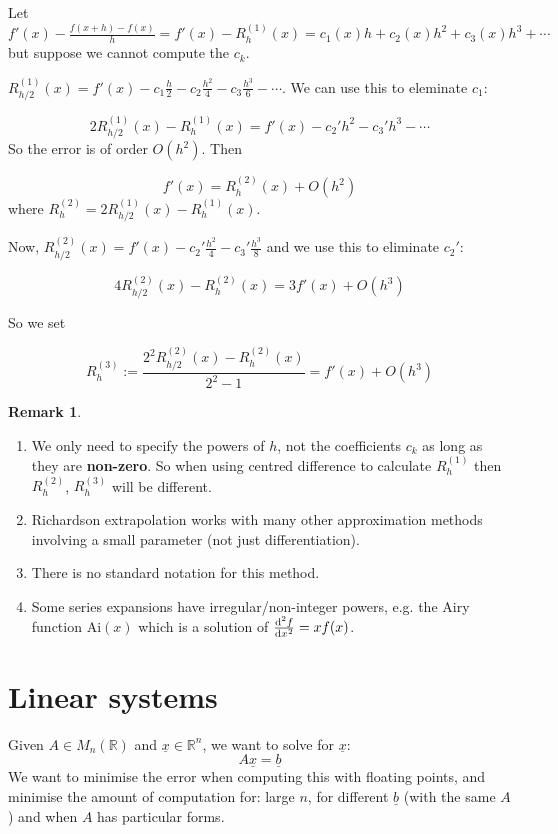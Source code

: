 \documentclass[12pt,a4paper]{article}
\theoremstyle{definition}
\newtheorem*{remark}{Remark}
\begin{document}
Let $f'(x) - \frac{f(x + h) - f(x)}{h} = f'(x) - R_h^{(1)} (x) = c_1(x) h + c_2(x) h^2 + c_3(x) h^3 + \cdots$ but suppose we cannot compute the $c_k$.

$R_{h / 2}^{(1)} (x) = f'(x) - c_1 \frac{h}{2} - c_2 \frac{h^2}{4} - c_3 \frac{h^3}{6} - \cdots$. We can use this to eleminate $c_1$:

\[ 2 R_{h / 2}^{(1)} (x) - R_h^{(1)} (x) = f'(x) - c_2' h^2 - c_3' h^3 - \cdots \]
So the error is of order $O(h^2)$. Then

\[ f'(x) = R_h^{(2)} (x) + O(h^2) \]
where $R_h^{(2)} = 2 R_{h / 2}^{(1)} (x) - R_h^{(1)} (x)$.

Now, $R_{h / 2}^{(2)} (x) = f'(x) - c_2' \frac{h^2}{4} - c_3' \frac{h^3}{8}$ and we use this to eliminate $c_2'$:

\[ 4 R_{h / 2}^{(2)} (x) - R_h^{(2)} (x) = 3 f'(x) + O(h^3) \]

So we set

\[ R_h^{(3)} := \frac{2^2 R_{h / 2}^{(2)} (x) - R_h^{(2)}(x)}{2^2 - 1} = f'(x) + O(h^3) \]

\begin{remark}
	\hfill
	\begin{enumerate}
		\item We only need to specify the powers of $h$, not the coefficients $c_k$ as long as they are \textbf{non-zero}. So when using centred difference to calculate $R_h^{(1)}$ then $R_h^{(2)}$, $R_h^{(3)}$ will be different.
		\item Richardson extrapolation works with many other approximation methods involving a small parameter (not just differentiation).
		\item There is no standard notation for this method.
		\item Some series expansions have irregular/non-integer powers, e.g. the Airy function $\text{Ai}(x)$ which is a solution of $\diff[2]{f}{x} = x f(x)$.
	\end{enumerate}
\end{remark}

\section{Linear systems}

Given $A \in M_n(\mathbb{R})$ and $\underline{x} \in \mathbb{R}^n$, we want to solve for $\underline{x}$:
\[
	A \underline{x} = \underline{b}
\]
We want to minimise the error when computing this with floating points, and minimise the amount of computation for: large $n$, for different $\underline{b}$ (with the same $A$) and when $A$ has particular forms.
\end{document}
